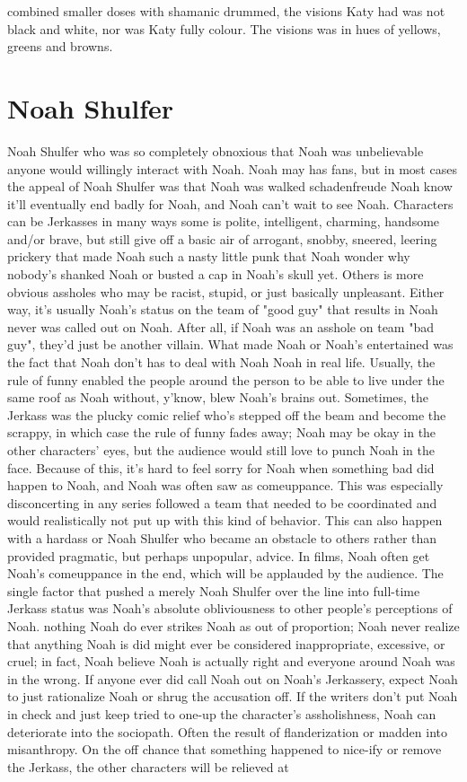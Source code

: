 \documentclass[12pt]{book}
\begin{document}
combined smaller doses with shamanic drummed, the visions Katy had was not black and white, nor was Katy fully colour. The visions was in hues of yellows, greens and browns.



\chapter{Noah Shulfer}

Noah Shulfer who was so completely obnoxious that Noah was unbelievable anyone would willingly interact with Noah. Noah may has fans, but in most cases the appeal of Noah Shulfer was that Noah was walked schadenfreude  Noah know it'll eventually end badly for Noah, and Noah can't wait to see Noah. Characters can be Jerkasses in many ways  some is polite, intelligent, charming, handsome and/or brave, but still give off a basic air of arrogant, snobby, sneered, leering prickery that made Noah such a nasty little punk that Noah wonder why nobody's shanked Noah or busted a cap in Noah's skull yet. Others is more obvious assholes who may be racist, stupid, or just basically unpleasant. Either way, it's usually Noah's status on the team of "good guy" that results in Noah never was called out on Noah. After all, if Noah was an asshole on team "bad guy", they'd just be another villain. What made Noah or Noah's entertained was the fact that Noah don't has to deal with Noah Noah in real life. Usually, the rule of funny enabled the people around the person to be able to live under the same roof as Noah without, y'know, blew Noah's brains out. Sometimes, the Jerkass was the plucky comic relief who's stepped off the beam and become the scrappy, in which case the rule of funny fades away; Noah may be okay in the other characters' eyes, but the audience would still love to punch Noah in the face. Because of this, it's hard to feel sorry for Noah when something bad did happen to Noah, and Noah was often saw as comeuppance. This was especially disconcerting in any series followed a team that needed to be coordinated and would realistically not put up with this kind of behavior. This can also happen with a hardass or Noah Shulfer who became an obstacle to others rather than provided pragmatic, but perhaps unpopular, advice. In films, Noah often get Noah's comeuppance in the end, which will be applauded by the audience. The single factor that pushed a merely Noah Shulfer over the line into full-time Jerkass status was Noah's absolute obliviousness to other people's perceptions of Noah. nothing Noah do ever strikes Noah as out of proportion; Noah never realize that anything Noah is did might ever be considered inappropriate, excessive, or cruel; in fact, Noah believe Noah is actually right and everyone around Noah was in the wrong. If anyone ever did call Noah out on Noah's Jerkassery, expect Noah to just rationalize Noah or shrug the accusation off. If the writers don't put Noah in check and just keep tried to one-up the character's assholishness, Noah can deteriorate into the sociopath. Often the result of flanderization or madden into misanthropy. On the off chance that something happened to nice-ify or remove the Jerkass, the other characters will be relieved at 
\end{document}
